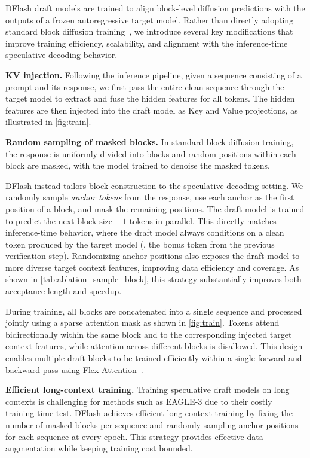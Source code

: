 DFlash draft models are trained to align block-level diffusion predictions with the outputs of a frozen autoregressive target model. Rather than directly adopting standard block diffusion training~\cite{arriola2025blockdiffusioninterpolatingautoregressive}, we introduce several key modifications that improve training efficiency, scalability, and alignment with the inference-time speculative decoding behavior.

\textbf{KV injection.  } Following the inference pipeline, given a sequence consisting of a prompt and its response, we first pass the entire clean sequence through the target model to extract and fuse the hidden features for all tokens. The hidden features are then injected into the draft model as Key and Value projections, as illustrated in \autoref{fig:train}.

\textbf{Random sampling of masked blocks.  } In standard block diffusion training, the response is uniformly divided into blocks and random positions within each block are masked, with the model trained to denoise the masked tokens.

DFlash instead tailors block construction to the speculative decoding setting. We randomly sample \emph{anchor tokens} from the response, use each anchor as the first position of a block, and mask the remaining positions. The draft model is trained to predict the next $\text{block\_size} - 1$ tokens in parallel. This directly matches inference-time behavior, where the draft model always conditions on a clean token produced by the target model (\ie, the bonus token from the previous verification step). Randomizing anchor positions also exposes the draft model to more diverse target context features, improving data efficiency and coverage. As shown in \autoref{tab:ablation_sample_block}, this strategy substantially improves both acceptance length and speedup.

During training, all blocks are concatenated into a single sequence and processed jointly using a sparse attention mask as shown in \autoref{fig:train}. Tokens attend bidirectionally within the same block and to the corresponding injected target context features, while attention across different blocks is disallowed. This design enables multiple draft blocks to be trained efficiently within a single forward and backward pass using Flex Attention~\citep{dong2024flexattentionprogrammingmodel}.


\textbf{Efficient long-context training.  } Training speculative draft models on long contexts is challenging for methods such as EAGLE-3 due to their costly training-time test. DFlash achieves efficient long-context training by fixing the number of masked blocks per sequence and randomly sampling anchor positions for each sequence at every epoch. This strategy provides effective data augmentation while keeping training cost bounded.

